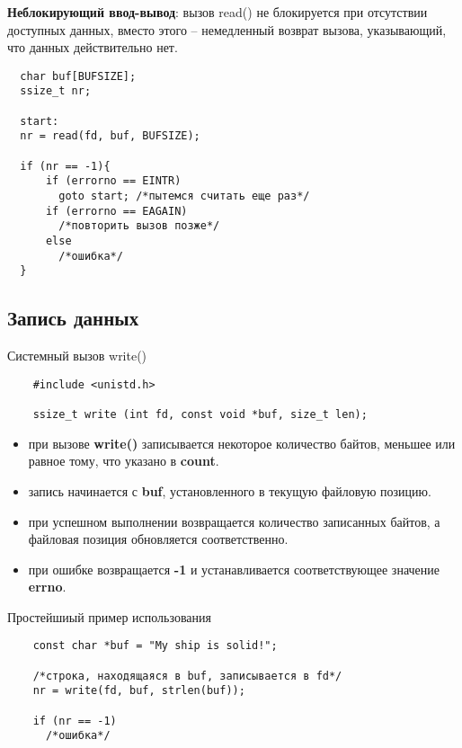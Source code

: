 \documentclass[xcolor=table]{beamer}
\begin{document}
\begin{frame}[fragile]
\textbf{Неблокирующий ввод-вывод}: вызов read() не блокируется при отсутствии доступных данных, вместо этого -- немедленный возврат вызова, указывающий, что данных действительно нет. 

\begin{verbatim}
  char buf[BUFSIZE];
  ssize_t nr;
  
  start:
  nr = read(fd, buf, BUFSIZE);
  
  if (nr == -1){
      if (errorno == EINTR)
        goto start; /*пытемся считать еще раз*/
      if (errorno == EAGAIN)
        /*повторить вызов позже*/
      else
        /*ошибка*/
  }
\end{verbatim}
\end{frame}

\subsection{Запись данных}

\begin{frame}[fragile]{Системный вызов write()}
	\begin{verbatim}
	#include <unistd.h>
	
	ssize_t write (int fd, const void *buf, size_t len);
	\end{verbatim}
	
	\begin{itemize}
		\item при вызове \textbf{write()} записывается некоторое количество байтов, меньшее или равное тому, что указано в \textbf{count}. 
		\item запись начинается с \textbf{buf}, установленного в текущую файловую позицию. 
		\item при успешном выполнении возвращается количество записанных байтов, а файловая позиция обновляется соответственно. 
		\item при ошибке возвращается \textbf{-1} и устанавливается соответствующее значение \textbf{errno}.
	\end{itemize}
\end{frame}

\begin{frame}[fragile]{Простейшиый пример использования}
	\begin{verbatim}
	const char *buf = "My ship is solid!";
	
	/*строка, находящаяся в buf, записывается в fd*/
	nr = write(fd, buf, strlen(buf));
	
	if (nr == -1)
	  /*ошибка*/
	\end{verbatim}
\end{frame}
\end{document}
